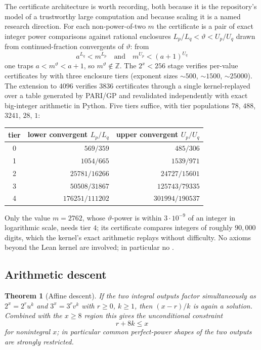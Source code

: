 \documentclass[11pt,oneside]{article}
\newtheorem{theorem}{Theorem}[section]
\theoremstyle{definition}
\theoremstyle{remark}
\newcommand{\Z}{\mathbb Z}
\newcommand{\thetaq}{\vartheta}
\newcommand{\lean}[1]{\texttt{\detokenize{#1}}}
\begin{document}
The certificate architecture is worth recording, both because it is the repository's model
of a trustworthy large computation and because scaling it is a named research direction.
For each non-power-of-two $m$ the certificate is a pair of exact integer power comparisons
against rational enclosures $L_p/L_q<\thetaq<U_p/U_q$ drawn from continued-fraction
convergents of $\thetaq$: from
\[
a^{L_q}<m^{L_p}
\quad\text{and}\quad
m^{U_p}<(a+1)^{U_q}
\]
one traps $a<m^{\thetaq}<a+1$, so $m^{\thetaq}\notin\Z$.  The $2^x<256$ stage verifies
per-value certificates by \lean{norm_num} with three enclosure tiers (exponent sizes
${\sim}500$, ${\sim}1500$, ${\sim}25000$).  The extension to $4096$ verifies $3836$
certificates through a single kernel-replayed \lean{decide} over a table generated by
PARI/GP and revalidated independently with exact big-integer arithmetic in Python.  Five
tiers suffice, with tier populations $78$, $488$, $3241$, $28$, $1$:

\begin{center}
\small
\begin{tabular}{@{}crr@{}}
\toprule
tier & lower convergent $L_p/L_q$ & upper convergent $U_p/U_q$ \\
\midrule
0 & $569/359$ & $485/306$ \\
1 & $1054/665$ & $1539/971$ \\
2 & $25781/16266$ & $24727/15601$ \\
3 & $50508/31867$ & $125743/79335$ \\
4 & $176251/111202$ & $301994/190537$ \\
\bottomrule
\end{tabular}
\end{center}

Only the value $m=2762$, whose $\thetaq$-power is within $3\cdot10^{-9}$ of an integer in
logarithmic scale, needs tier $4$; its certificate compares integers of roughly $90{,}000$
digits, which the kernel's exact arithmetic replays without difficulty.  No axioms beyond
the Lean kernel are involved; in particular no \lean{native_decide}.

\subsection{Arithmetic descent}
\label{co:descent}

\begin{theorem}[Affine descent]
\label{co:thm-descent}
If the two integral outputs factor simultaneously as $2^x=2^ru^k$ and $3^x=3^rv^k$ with
$r\ge0$, $k\ge1$, then $(x-r)/k$ is again a solution.  Combined with the $x\ge8$ region this
gives the unconditional constraint
\[
r+8k\le x
\]
for nonintegral $x$; in particular common perfect-power shapes of the two outputs are
strongly restricted.
\end{theorem}
\end{document}
